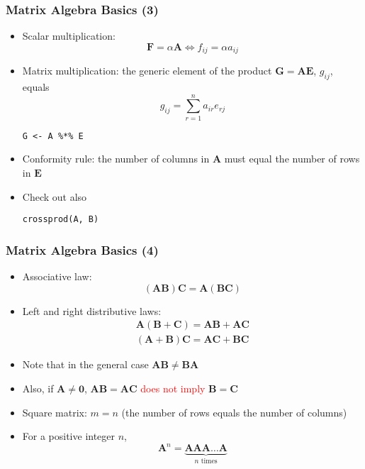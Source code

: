 \documentclass[10pt]{beamer}
\theoremstyle{definition}
\begin{document}
\begin{frame}[fragile]
\frametitle{Matrix Algebra Basics (3)}
\begin{itemize}
	\item Scalar multiplication:
	\[
		\mathbf{F} = \alpha\mathbf{A} \Leftrightarrow f_{ij} = \alpha a_{ij}
	\]

	\item Matrix multiplication: the generic element of the product $\mathbf{G} = \mathbf{AE}$, $g_{ij}$, equals
	\[
		g_{ij} = \sum_{r=1}^{n}a_{ir}e_{rj}
	\]
	\begin{lstlisting}[style = rstyle, breaklines]
	G <- A %*% E 	
	\end{lstlisting}

	\item Conformity rule: the number of columns in $\mathbf{A}$ must equal the number of rows in $\mathbf{E}$
	
	\item Check out also
	\begin{lstlisting}[style = rstyle, breaklines]
	crossprod(A, B)
	\end{lstlisting}
\end{itemize}
\end{frame}

\begin{frame}[fragile]
\frametitle{Matrix Algebra Basics (4)}
\begin{itemize}
	\item Associative law:
	\[
		\mathbf{(AB)C} = \mathbf{A(BC)}
	\]
	\item Left and right distributive laws:
	\[
		\begin{array}{lcl}
			\mathbf{A(B + C) = AB + AC}\\
			\mathbf{(A + B)C = AC + BC}
		\end{array}
	\]
	\item Note that in the general case $\mathbf{AB \neq BA}$
	\item Also, if $\mathbf{A \neq 0}$, $\mathbf{AB = AC}$ \textcolor{red}{does not imply} $\mathbf{B = C}$
	\item Square matrix: $m = n$ (the number of rows equals the number of columns)
	\item For a positive integer $n$,
	\[
		\mathbf{A}^{n} = \underset{n \textrm{ times}}{\underbrace{\mathbf{AAA\ldots A}}}
	\]
\end{itemize}
\end{frame}
\end{document}
